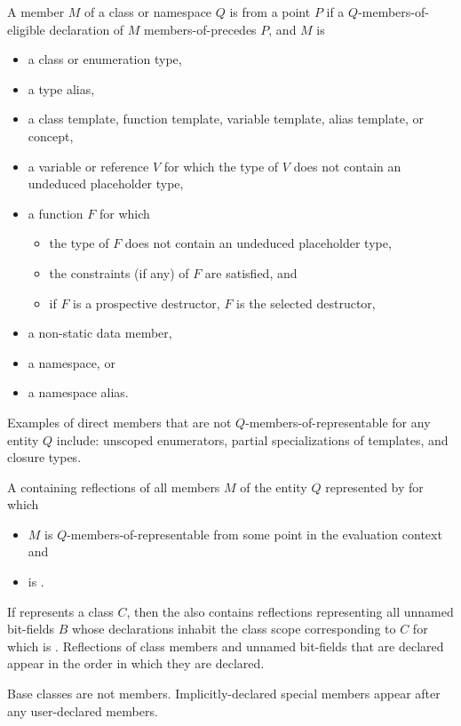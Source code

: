 \begin{itemdescr}
\pnum
A member $M$ of a class or namespace $Q$ is
 from a point $P$
if a $Q$-members-of-eligible declaration of $M$ members-of-precedes $P$,
and $M$ is
\begin{itemize}
\item
  a class or enumeration type,
\item
  a type alias,
\item
  a class template, function template,
  variable template, alias template, or concept,
\item
  a variable or reference $V$
  for which the type of $V$ does not contain an undeduced placeholder type,
\item
  a function $F$ for which
  \begin{itemize}
  \item
    the type of $F$  does not contain an undeduced placeholder type,
  \item
    the constraints (if any) of $F$ are satisfied, and
  \item
    if $F$ is a prospective destructor,
    $F$ is the selected destructor,
  \end{itemize}
\item
  a non-static data member,
\item
  a namespace, or
\item
  a namespace alias.
\end{itemize}
\begin{note}
Examples of direct members that are not $Q$-members-of-representable
for any entity $Q$ include:
unscoped enumerators,
partial specializations of templates, and
closure types.
\end{note}

\pnum
\returns
A  containing reflections of all members $M$
of the entity $Q$ represented by  for which
\begin{itemize}
\item
  $M$ is $Q$-members-of-representable
  from some point in the evaluation context and
\item
   is .
\end{itemize}
If  represents a class $C$,
then the  also contains reflections
representing all unnamed bit-fields $B$
whose declarations inhabit the class scope corresponding to $C$
for which  is .
Reflections of class members and unnamed bit-fields that are declared
appear in the order in which they are declared.
\begin{note}
Base classes are not members.
Implicitly-declared special members
appear after any user-declared members.
\end{note}


\end{itemdescr}
